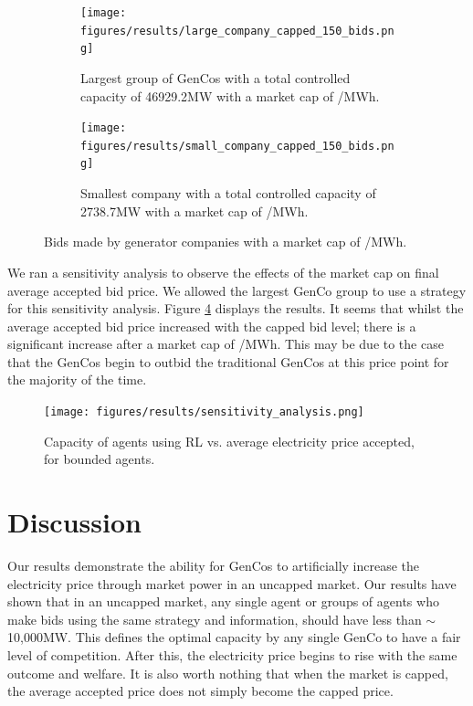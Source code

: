 \documentclass[conference]{IEEEtran}
\begin{document}
\begin{figure}
\centering
\begin{subfigure}[b]{0.49\textwidth}   
\texttt{[image: figures/results/large\_company\_capped\_150\_bids.png]}
\caption{Largest group of GenCos with a total controlled capacity of 46929.2MW with a market cap of /MWh.}
\label{fig:large_company_capped_150_bids}
\end{subfigure}
\hfil
\begin{subfigure}[b]{0.49\textwidth}   
\texttt{[image: figures/results/small\_company\_capped\_150\_bids.png]}
\caption{Smallest company with a total controlled capacity of 2738.7MW with a market cap of /MWh.}
\label{fig:small_company_capped_150_bids}
\end{subfigure}
\caption{Bids made by generator companies with a market cap of /MWh.}
\label{fig:capped_150_bids}
\end{figure}

We ran a sensitivity analysis to observe the effects of the market cap on final average accepted bid price. We allowed the largest GenCo group to use a strategy for this sensitivity analysis. Figure \ref{fig:sensitivity_analysis} displays the results. It seems that whilst the average accepted bid price increased with the capped bid level; there is a significant increase after a market cap of /MWh. This may be due to the case that the GenCos begin to outbid the traditional GenCos at this price point for the majority of the time. 

\begin{figure}
    \texttt{[image: figures/results/sensitivity\_analysis.png]}
    \caption{Capacity of agents using RL vs. average electricity price accepted, for bounded agents.}
    \label{fig:sensitivity_analysis}
\end{figure}






\section{Discussion}
\label{sec:discussion}

Our results demonstrate the ability for GenCos to artificially increase the electricity price through market power in an uncapped market. Our results have shown that in an uncapped market, any single agent or groups of agents who make bids using the same strategy and information, should have less than ${\sim}$10,000MW. This defines the optimal capacity by any single GenCo to have a fair level of competition. After this, the electricity price begins to rise with the same outcome and welfare. It is also worth nothing that when the market is capped, the average accepted price does not simply become the capped price.
\end{document}
